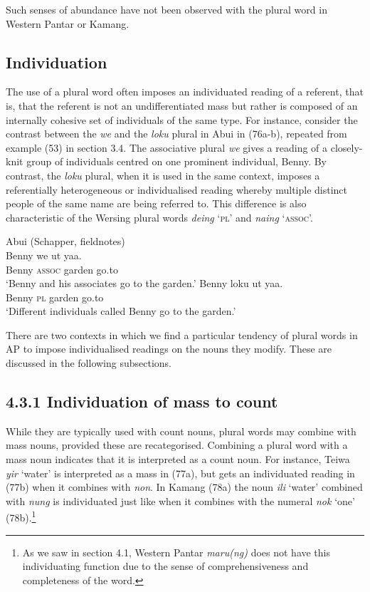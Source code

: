 Such senses of abundance have not been observed with the plural word in Western Pantar or Kamang.

\subsection{Individuation} %
The use of a plural word often imposes an individuated reading of a referent, that is, that the referent is not an undifferentiated mass but rather is composed of an internally cohesive set of individuals of the same type. For instance, consider the contrast between the \textit{we} and the \textit{loku} plural in Abui in (76a-b), repeated from example (53) in section 3.4. The associative plural \textit{we} gives a reading of a closely-knit group of individuals centred on one prominent individual, Benny. By contrast, the \textit{loku} plural, when it is used in the same context, imposes a referentially heterogeneous or individualised reading whereby multiple distinct people of the same name are being referred to. This difference is also characteristic of the Wersing plural words \textit{deing} `\textsc{pl}' and \textit{naing} `\textsc{assoc}'.


\ea%
\label{ex:76}
Abui (Schapper, fieldnotes)\\
\ea
\gll Benny w{e} ut yaa. \\
   Benny \textsc{assoc} garden go.to \\
\glt `Benny and his associates go to the garden.'
\ex
\gll Benny loku ut yaa.\\
  Benny \textsc{pl} garden go.to  \\
\glt  `Different individuals called Benny go to the garden.'
\z
\z





There are two contexts in which we find a particular tendency of plural words in AP to impose individualised readings on the nouns they modify. These are discussed in the following subsections.

\subsection{\textup{4.3.1 Individuation of mass to count}}
While they are typically used with count nouns, plural words may combine with mass nouns, provided these are recategorised. Combining a plural word with a mass noun indicates that it is interpreted as a count noun. For instance, Teiwa \textit{yir} `water' is interpreted as a mass in (77a), but gets an individuated reading in (77b) when it combines with \textit{non}. In Kamang (78a) the noun \textit{ili} `water' combined with \textit{nung} is individuated just like when it combines with the numeral \textit{nok} `one' (78b).\footnote{ As we saw in section 4.1, Western Pantar \textit{maru(ng)} does not have this individuating function due to the sense of comprehensiveness and completeness of the word.}


